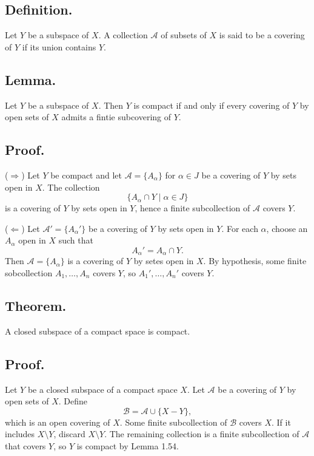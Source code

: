 \documentclass[titlepage]{article}
\begin{document}
\subsection{Definition.} Let $Y$ be a subspace of $X$. A collection $\mathcal{A}$ of subsets of $X$ is said to be a covering of $Y$ if its union contains $Y$.

\subsection{Lemma.} Let $Y$ be a subspace of $X$. Then $Y$ is compact if and only if every covering of $Y$ by open sets of $X$ admits a fintie subcovering of $Y$.

\subsection{Proof.} 

($\Rightarrow$) Let $Y$ be compact and let $\mathcal{A} = \{A_{\alpha}\}$ for $\alpha \in J$ be a covering of $Y$ by sets open in $X$. The collection 
$$\{A_{\alpha} \cap Y \mid \alpha \in J\}$$
is a covering of $Y$ by sets open in $Y$, hence a finite subcollection of $\mathcal{A}$ covers $Y$.

($\Leftarrow$) Let $\mathcal{A}' = \{A_{\alpha}'\}$ be a covering of $Y$ by sets open in $Y$. For each $\alpha$, choose an $A_{\alpha}$ open in $X$ such that 
$$A_{\alpha}' = A_{\alpha} \cap Y.$$
Then $\mathcal{A} = \{A_{\alpha}\}$ is a covering of $Y$ by setes open in $X$. By hypothesis, some finite sobcollection $A_{1}, \ldots, A_{n}$ covers $Y$, so $A_{1}', \ldots, A_{n}'$ covers $Y$.

\subsection{Theorem.} A closed subspace of a compact space is compact.

\subsection{Proof.} Let $Y$ be a closed subspace of a compact space $X$. Let $\mathcal{A}$ be a covering of $Y$ by open sets of $X$. Define 
$$\mathcal{B} = \mathcal{A} \cup \{X - Y\},$$
which is an open covering of $X$. Some finite subcollection of $\mathcal{B}$ covers $X$. If it includes $X \setminus Y$, discard $X \setminus Y$. The remaining collection is a finite subcollection of $\mathcal{A}$ that covers $Y$, so $Y$ is compact by Lemma 1.54.
\end{document}
